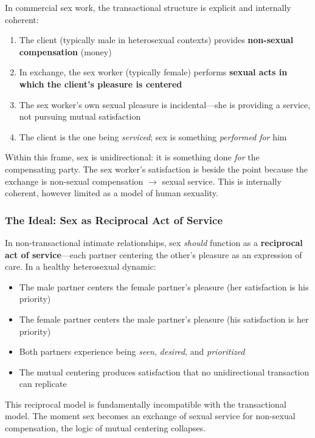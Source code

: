 \documentclass[12pt, letterpaper]{article}
\begin{document}
In commercial sex work, the transactional structure is explicit and internally coherent:

\begin{enumerate}
    \item The client (typically male in heterosexual contexts) provides \textbf{non-sexual compensation} (money)
    \item In exchange, the sex worker (typically female) performs \textbf{sexual acts in which the client's pleasure is centered}
    \item The sex worker's own sexual pleasure is incidental---she is providing a service, not pursuing mutual satisfaction
    \item The client is the one being \textit{serviced}; sex is something \textit{performed for} him
\end{enumerate}

Within this frame, sex is unidirectional: it is something done \textit{for} the compensating party. The sex worker's satisfaction is beside the point because the exchange is non-sexual compensation $\rightarrow$ sexual service. This is internally coherent, however limited as a model of human sexuality.

\subsubsection{The Ideal: Sex as Reciprocal Act of Service}

In non-transactional intimate relationships, sex \textit{should} function as a \textbf{reciprocal act of service}---each partner centering the other's pleasure as an expression of care. In a healthy heterosexual dynamic:

\begin{itemize}
    \item The male partner centers the female partner's pleasure (her satisfaction is his priority)
    \item The female partner centers the male partner's pleasure (his satisfaction is her priority)
    \item Both partners experience being \textit{seen}, \textit{desired}, and \textit{prioritized}
    \item The mutual centering produces satisfaction that no unidirectional transaction can replicate
\end{itemize}

This reciprocal model is fundamentally incompatible with the transactional model. The moment sex becomes an exchange of sexual service for non-sexual compensation, the logic of mutual centering collapses.
\end{document}
